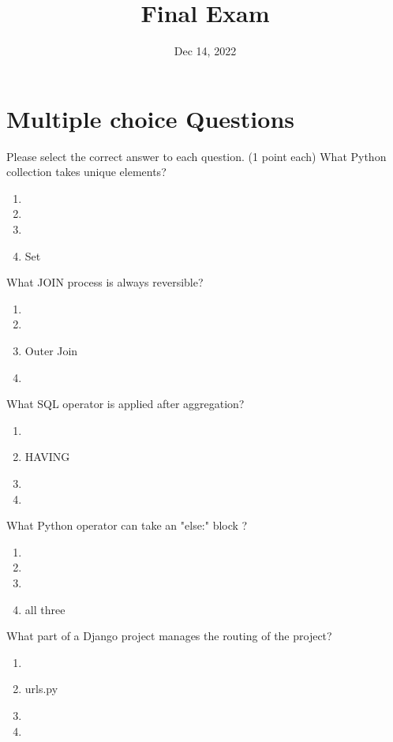 \documentclass{homework}
\author{}
\title{Final Exam}
\date{Dec 14, 2022}
\begin{document}
 \maketitle
\section*{Multiple choice Questions}
Please select the correct answer to each question. (1 point each)
\question What Python collection takes unique elements?
\begin{enumerate}[label=\alph*)]
    \item  
    \item 
    \item 
    \item Set
\end{enumerate}

\question What JOIN process is always reversible?
\begin{enumerate}[label=\alph*)]
    \item 
    \item 
    \item Outer Join
    \item 
\end{enumerate}

\question What SQL operator is applied after aggregation?
\begin{enumerate}[label=\alph*)]
    \item 
    \item HAVING
    \item 
    \item 
\end{enumerate}

\question What Python operator can take an "else:" block ?
\begin{enumerate}[label=\alph*)]
    \item 
    \item 
    \item 
    \item all three
\end{enumerate}

\question What part of a Django project manages the routing of the project?
\begin{enumerate}[label=\alph*)]
    \item 
    \item urls.py
    \item 
    \item 
\end{enumerate}
\end{document}
